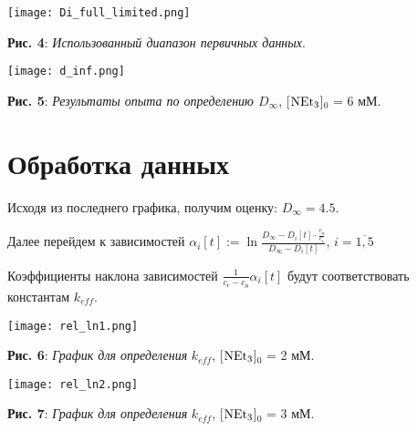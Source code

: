 \documentclass[a4paper]{article}
\begin{document}
\graphicspath{{./images/}}
		\begin{center}
		
			\texttt{[image: Di\_full\_limited.png]}
    \par
\textbf{Рис. 4}: \textit{Использованный диапазон первичных данных}.
\end{center}
\par \vspace{0.5 cm}

\graphicspath{{./images/}}
		\begin{center}
		
			\texttt{[image: d\_inf.png]}
    \par
\textbf{Рис. 5}: \textit{Результаты опыта по определению $D_{\infty}$}, [$\rm NEt_3$]$_0$ = 6 мМ.
\end{center}
\par \vspace{0.5 cm}


\section{\LARGE Обработка данных}
\par \hspace{0.4 cm}
Исходя из последнего графика, получим оценку: $D_{\infty} = 4.5$. \par
Далее перейдем к зависимостей $\alpha_i[t] := \ln{ \frac{D_{\infty} - D_i[t] \cdot \frac{c_{\text{д}}}{c_{\text{г}}}}{D_{\infty} - D_i[t]}}$, $i = \overline{1, 5}$ \par
Коэффициенты наклона зависимостей $\frac{1}{c_{\text{г}} - c_{\text{д}}} \alpha_i[t]$ будут соответствовать константам $k_{eff}$.

\graphicspath{{./images/}}
		\begin{center}
		
			\texttt{[image: rel\_ln1.png]}
    \par
\textbf{Рис. 6}: \textit{График для определения} $k_{eff}$, [$\rm NEt_3$]$_0$ = 2 мМ.
\end{center}
\par \vspace{0.5 cm}

\graphicspath{{./images/}}
		\begin{center}
		
			\texttt{[image: rel\_ln2.png]}
    \par
\textbf{Рис. 7}: \textit{График для определения} $k_{eff}$, [$\rm NEt_3$]$_0$ = 3 мМ. 
\end{center}
\par \vspace{0.5 cm}
\end{document}
